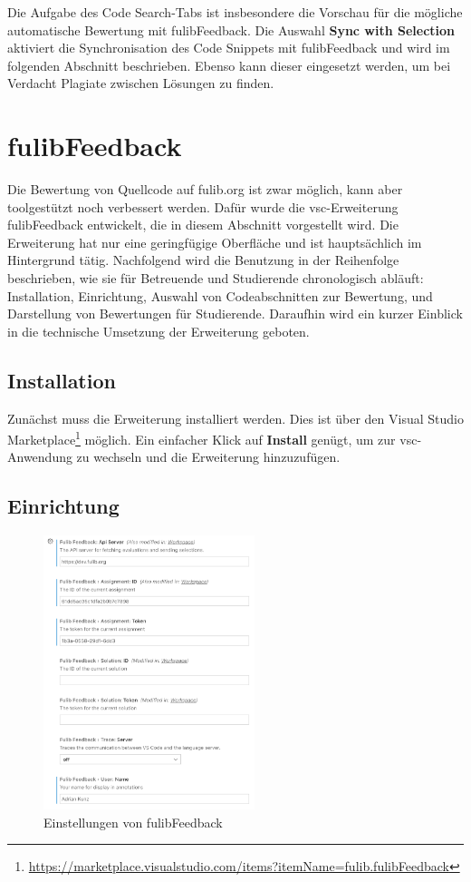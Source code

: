 Die Aufgabe des Code Search-Tabs ist insbesondere die Vorschau für die mögliche automatische Bewertung mit fulibFeedback.
Die Auswahl \textbf{Sync with Selection} aktiviert die Synchronisation des Code Snippets mit fulibFeedback und wird im folgenden Abschnitt beschrieben.
Ebenso kann dieser eingesetzt werden, um bei Verdacht Plagiate zwischen Lösungen zu finden.

\section{fulibFeedback}\label{sec:fulibFeedback}

Die Bewertung von Quellcode auf fulib.org ist zwar möglich, kann aber toolgestützt noch verbessert werden.
Dafür wurde die \ac{vsc}-Erweiterung fulibFeedback entwickelt, die in diesem Abschnitt vorgestellt wird.
Die Erweiterung hat nur eine geringfügige Oberfläche und ist hauptsächlich im Hintergrund tätig.
Nachfolgend wird die Benutzung in der Reihenfolge beschrieben, wie sie für Betreuende und Studierende chronologisch abläuft:
Installation, Einrichtung, Auswahl von Codeabschnitten zur Bewertung, und Darstellung von Bewertungen für Studierende.
Daraufhin wird ein kurzer Einblick in die technische Umsetzung der Erweiterung geboten.

\subsection{Installation}

Zunächst muss die Erweiterung installiert werden.
Dies ist über den Visual Studio Marketplace\footnote{
    \url{https://marketplace.visualstudio.com/items?itemName=fulib.fulibFeedback}
} möglich.
Ein einfacher Klick auf \textbf{Install} genügt, um zur \ac{vsc}-Anwendung zu wechseln und die Erweiterung hinzuzufügen.

\subsection{Einrichtung}

\begin{figure}
    \centering
    \includegraphics[width=0.55\textwidth]{images/fulibFeedback-settings.png}
    \caption{Einstellungen von fulibFeedback}
    \label{fig:fulibFeedback-settings}
\end{figure}

